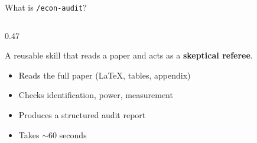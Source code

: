 \documentclass[aspectratio=169, 10pt]{beamer}
\begin{document}


\begin{frame}[fragile]{What is \texttt{/econ-audit}?}
\vskip-2pt
\begin{columns}[T]
\begin{column}{0.47\textwidth}
\begin{tcolorbox}[keybox, title={\faSearch\quad An Adversarial Review Skill}, top=3pt, bottom=3pt]
\small
A reusable skill that reads a paper and acts as a \textbf{skeptical referee}.
\vskip3pt
\begin{itemize}\setlength{\itemsep}{1pt}
  \item Reads the full paper (LaTeX, tables, appendix)
  \item Checks identification, power, measurement
  \item Produces a structured audit report
  \item Takes $\sim$60 seconds
\end{itemize}
\end{tcolorbox}


\end{column}
\end{columns}
\end{frame}
\end{document}
